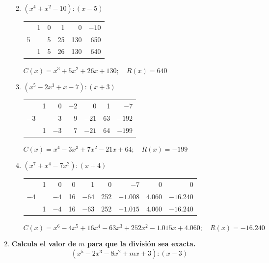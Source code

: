 \documentclass[a4paper,12pt]{article}
\begin{document}
\begin{enumerate}
\begin{enumerate}[label=\textbf{\alph*)}]
    \vspace{0.4cm}

    \item $(x^4 + x^2 - 10) : (x - 5)$
    
    \begin{center}
    \begin{tabular}{r|rrrrr}
      & 1 & 0 & 1 & 0 & $-10$ \\
    5 &   & 5 & 25 & 130 & 650 \\ \hline
      & 1 & 5 & 26 & 130 & \multicolumn{1}{|r}{640}
    \end{tabular}
    
    \smallskip
    $C(x) = x^3 + 5x^2 + 26x + 130; \quad R(x) = 640$
    \end{center}

    \vspace{0.4cm}

    \item $(x^5 - 2x^3 + x - 7) : (x + 3)$
    
    \begin{center}
    \begin{tabular}{r|rrrrrr}
      & 1 & 0 & $-2$ & 0 & 1 & $-7$ \\
    $-3$ &   & $-3$ & 9 & $-21$ & 63 & $-192$ \\ \hline
      & 1 & $-3$ & 7 & $-21$ & 64 & \multicolumn{1}{|r}{$-199$}
    \end{tabular}
    
    \smallskip
    $C(x) = x^4 - 3x^3 + 7x^2 - 21x + 64; \quad R(x) = -199$
    \end{center}

    \vspace{0.4cm}

    \item $(x^7 + x^4 - 7x^2) : (x + 4)$
    
    \begin{center}
    \small
    \begin{tabular}{r|rrrrrrrr}
      & 1 & 0 & 0 & 1 & 0 & $-7$ & 0 & 0 \\
    $-4$ &   & $-4$ & 16 & $-64$ & 252 & $-1.008$ & 4.060 & $-16.240$ \\ \hline
      & 1 & $-4$ & 16 & $-63$ & 252 & $-1.015$ & 4.060 & \multicolumn{1}{|r}{$-16.240$}
    \end{tabular}
    
    \smallskip
    $C(x) = x^6 - 4x^5 + 16x^4 - 63x^3 + 252x^2 - 1.015x + 4.060; \quad R(x) = -16.240$
    \end{center}
\end{enumerate}
\item \textbf{Calcula el valor de $m$ para que la división sea exacta.}
\[
(x^5 - 2x^3 - 8x^2 + mx + 3) : (x - 3)
\]


\end{enumerate}
\end{document}
